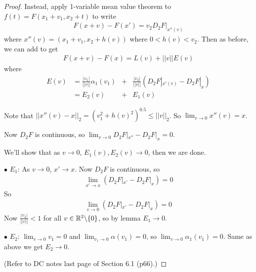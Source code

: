 \documentclass[a4paper]{article}
\begin{document}
\begin{thm}
\begin{proof}
Instead, apply 1-variable mean value theorem to $f(t)=F(x_1+v_1,x_2+t)$ to write
\begin{equation*}
\begin{aligned}
F(x+v)-F(x')=v_2D_2F|_{x''(v)}
\end{aligned}
\end{equation*}
where $x''(v)=(x_1+v_1,x_2+h(v))$ where $0<h(v)<v_2$. Then as before, we can add to get
\begin{equation*}
\begin{aligned}
F(x+v)-F(x)=L(v)+||v||E(v)
\end{aligned}
\end{equation*}
where
\begin{equation*}
\begin{aligned}
E(v)&=\frac{|v_1|}{||v||}\alpha_1(v_1)&+&\frac{|v_2|}{||v||}(D_2 F|_{x'(v)}-D_2F|_x)
\\&=E_2(v) &+& E_1(v)
\end{aligned}
\end{equation*}

Note that $||x''(v)-x||_2 = (v_1^2+h(v)^2)^{0.5} \leq ||v||_2$. So $\lim_{v \to 0} x''(v) = x$.

Now $D_2 F$ is continuous, so $\lim_{v \to 0} D_2 F|_{x''} - D_2 F|_x = 0$.

We'll show that as $v\to 0$, $E_1(v),E_2(v) \to 0$, then we are done.

$\bullet$ $E_1$: As $v \to 0$, $x' \to x$. Now $D_2 F$ is continuous, so 
\begin{equation*}
\begin{aligned}
\lim_{x' \to x}(D_2 F|_{x'}-D_2 F|_x) = 0
\end{aligned}
\end{equation*}
So
\begin{equation*}
\begin{aligned}
\lim_{v \to 0} (D_2 F|_{x'}-D_2 F|_x) = 0
\end{aligned}
\end{equation*}
Now $\frac{|v_2|}{||v||}<1$ for all $v \in \mathbb{R}^2 \backslash \{0\}$, so by lemma $E_1\to 0$.

$\bullet$ $E_2$: $\lim_{v\to 0} v_1 = 0$ and $\lim_{v_1\to 0} \alpha (v_1)=0$, so $\lim_{v \to 0} \alpha_1(v_1) = 0$. Same as above we get $E_2 \to 0$.

(Refer to DC notes last page of Section 6.1 (p66).)

\end{proof}
\end{thm}
\end{document}

